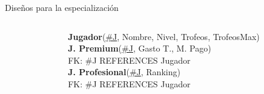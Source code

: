 \begin{frame}{Dise\~nos para la especializaci\'on}
\begin{columns}[T]
\begin{column}{0.40\linewidth}
{\begin{tikzpicture}[node distance=5em]
        
        
            \end{tikzpicture}
            }
        \end{column}

        \begin{column}{0.49\linewidth}
            \vspace{15mm}
            \begin{scriptsize}
                
                \textbf{Jugador}(\underline{\#J}, Nombre, Nivel, Trofeos, TrofeosMax)\\[2mm]
                \textbf{J. Premium}(\underline{\#J}, Gasto T., M. Pago)\\[1mm]
                \hspace{4mm} FK: \#J REFERENCES Jugador\\[2mm]
                \textbf{J. Profesional}(\underline{\#J}, Ranking)\\[1mm]
                \hspace{4mm} FK: \#J REFERENCES Jugador
            \end{scriptsize}
        \end{column}
        
    \end{columns}
\end{frame}



